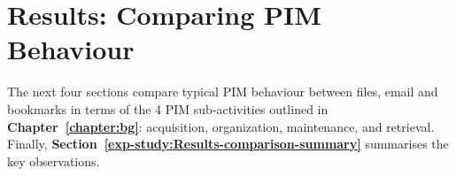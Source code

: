 \newpage
\section{Results: Comparing PIM Behaviour}
\label{exp-study:Results-comparison}


The next four sections compare typical PIM behaviour between files, email and bookmarks in terms of the 4 PIM sub-activities outlined in \textbf{Chapter~\ref{chapter:bg}}: acquisition, organization, maintenance, and retrieval. Finally, \textbf{Section~\ref{exp-study:Results-comparison-summary}} summarises the key observations.

